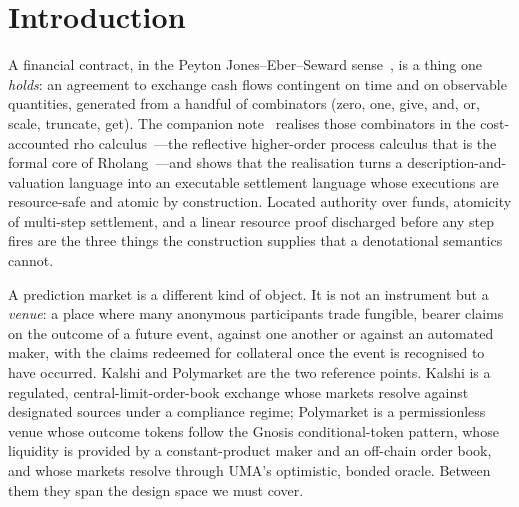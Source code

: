 \documentclass[11pt]{article}
\begin{document}
\tableofcontents
\bigskip

\section{Introduction}\label{sec:intro}

A financial contract, in the Peyton Jones--Eber--Seward sense~\cite{spj}, is a thing one
\emph{holds}: an agreement to exchange cash flows contingent on time and on observable
quantities, generated from a handful of combinators (\textsf{zero}, \textsf{one},
\textsf{give}, \textsf{and}, \textsf{or}, \textsf{scale}, \textsf{truncate}, \textsf{get}).
The companion note~\cite{finrho} realises those combinators in the cost-accounted rho
calculus~\cite{cost,cigslt}---the reflective higher-order process calculus that is the
formal core of Rholang~\cite{rholang}---and shows that the realisation turns a
description-and-valuation language into an executable settlement language whose executions
are resource-safe and atomic by construction. Located authority over funds, atomicity of
multi-step settlement, and a linear resource proof discharged before any step fires are the
three things the construction supplies that a denotational semantics cannot.

A prediction market is a different kind of object. It is not an instrument but a
\emph{venue}: a place where many anonymous participants trade fungible, bearer claims on the
outcome of a future event, against one another or against an automated maker, with the claims
redeemed for collateral once the event is recognised to have occurred. Kalshi and Polymarket
are the two reference points. Kalshi is a regulated, central-limit-order-book exchange whose
markets resolve against designated sources under a compliance regime; Polymarket is a
permissionless venue whose outcome tokens follow the Gnosis conditional-token pattern, whose
liquidity is provided by a constant-product maker and an off-chain order book, and whose
markets resolve through UMA's optimistic, bonded oracle. Between them they span the design
space we must cover.
\end{document}
